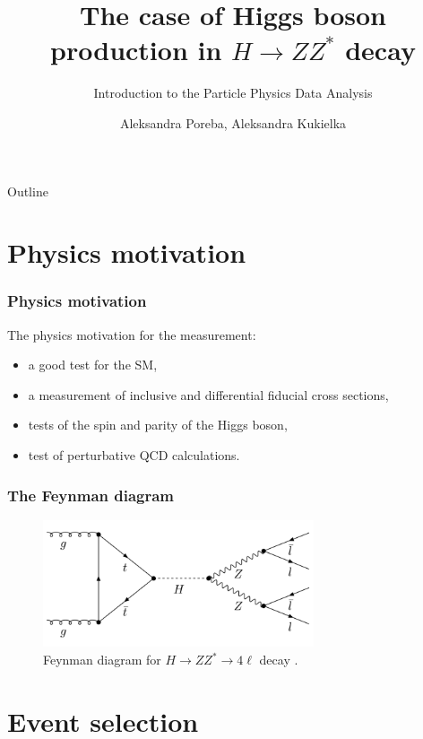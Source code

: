 \documentclass[aspectratio=1610, english]{beamer}
\author[Aleksandra Poreba, Aleksandra Kukielka]{Aleksandra Poreba, Aleksandra Kukielka}
\date{}
\title[The $H \rightarrow ZZ^{*}$ decay analysis]{The case of Higgs boson production in $H \rightarrow ZZ^{*}$ decay}
\subtitle{Introduction to the Particle Physics Data Analysis}
\newcommand{\hzz}{ H\rightarrow ZZ^{*}\rightarrow 4 \ell}
\begin{document}
\maketitle

\begin{frame}{Outline}
	\tableofcontents
\end{frame}

\section{Physics motivation}

\begin{frame}
\frametitle{Physics motivation}
The physics motivation for the measurement:
\begin{itemize}
\item a good test for the SM,
\item a measurement of inclusive and differential fiducial cross sections,
\item tests of the spin and parity of the Higgs boson,
\item test of perturbative QCD calculations.
\end{itemize}

\end{frame}

\begin{frame}
\frametitle{The Feynman diagram}

\begin{figure} [H]
\centering
\includegraphics[width=8cm]{feynman_diagram.png}
\caption{Feynman diagram for $\hzz$ decay \cite{diagram}. }
\end{figure}

\end{frame}

\section{Event selection}
\end{document}
